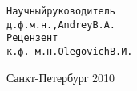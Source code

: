 \begin{titlepage}
    \begin{alltt}                                                         
                       Научный руководитель                                             
                       д.ф.м.н., Andrey В.А.                                            
                       Рецензент                                                        
                       к.ф.-м.н. Olegovich В.И.                                         
    \end{alltt}                                                           
                                                                                        
                                                                                        
    \vspace{\fill}                                                    
                                                                                        
    \begin{center}                                                        
    Санкт-Петербург 2010                                                                
    \end{center}                                                          
                                                                                        
    \end{titlepage}